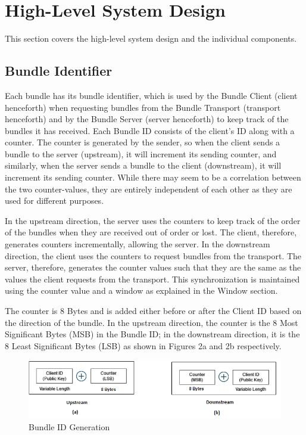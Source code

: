 \chapter{High-Level System Design}
This section covers the high-level system design and the individual components.

\section{Bundle Identifier}
Each bundle has its bundle identifier, which is used by the Bundle Client (client henceforth) when requesting bundles from the Bundle Transport (transport henceforth) and by the Bundle Server (server henceforth) to keep track of the bundles it has received. 
Each Bundle ID consists of the client’s ID along with a counter. The counter is generated by the sender, so when the client sends a bundle to the server (upstream), it will increment its sending counter, and similarly, when the server sends a bundle to the client (downstream), it will increment its sending counter. While there may seem to be a correlation between the two counter-values, they are entirely independent of each other as they are used for different purposes.

In the upstream direction, the server uses the counters to keep track of the order of the bundles when they are received out of order or lost. The client, therefore, generates counters incrementally, allowing the server. In the downstream direction, the client uses the counters to request bundles from the transport. The server, therefore, generates the counter values such that they are the same as the values the client requests from the transport. This synchronization is maintained using the counter value and a window as explained in the Window section.

The counter is 8 Bytes and is added either before or after the Client ID based on the direction of the bundle. In the upstream direction, the counter is the 8 Most Significant Bytes (MSB) in the Bundle ID; in the downstream direction, it is the 8 Least Significant Bytes (LSB) as shown in Figures 2a and 2b respectively.

\begin{figure}[ht!]
\centering
\includegraphics[width= 150mm]{./images/BundleID.png}
\caption{Bundle ID Generation}
\end{figure}

